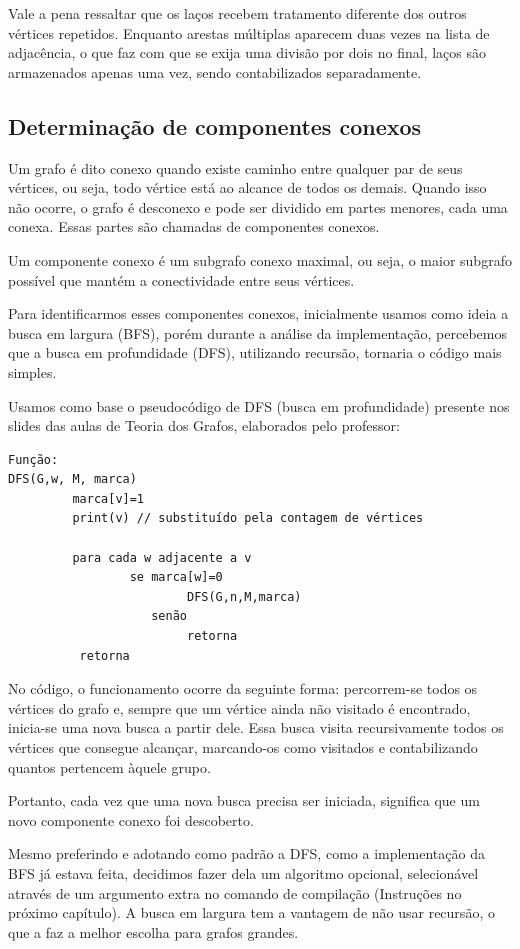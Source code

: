 \documentclass[a4paper, 12pt]{article}
\begin{document}
Vale a pena ressaltar que os laços recebem tratamento diferente dos outros vértices
repetidos. Enquanto arestas múltiplas aparecem duas vezes na lista de adjacência,
o que faz com que se exija uma divisão por dois no final, laços são armazenados
apenas uma vez, sendo contabilizados separadamente.


\subsection{Determinação de componentes conexos}

Um grafo é dito conexo quando existe caminho entre qualquer par de seus vértices,
ou seja, todo vértice está ao alcance de todos os demais. Quando isso não ocorre,
o grafo é desconexo e pode ser dividido em partes menores, cada uma conexa. Essas
partes são chamadas de componentes conexos.

Um componente conexo é um subgrafo conexo maximal, ou seja, o maior subgrafo
possível que mantém a conectividade entre seus vértices. 

Para identificarmos esses componentes conexos, inicialmente usamos como ideia a
busca em largura (BFS), porém durante a análise da implementação, percebemos que
a busca em profundidade (DFS), utilizando recursão, tornaria o código mais simples.

Usamos como base o pseudocódigo de DFS (busca em profundidade) presente nos slides
das aulas de Teoria dos Grafos, elaborados pelo professor:
\begin{verbatim}
Função:
DFS(G,w, M, marca) 
         marca[v]=1 
         print(v) // substituído pela contagem de vértices

         para cada w adjacente a v 
 	             se marca[w]=0 
                         DFS(G,n,M,marca) 
                    senão 
                         retorna
          retorna
\end{verbatim}

No código, o funcionamento ocorre da seguinte forma: percorrem-se todos os vértices
do grafo e, sempre que um vértice ainda não visitado é encontrado, inicia-se uma
nova busca a partir dele. Essa busca visita recursivamente todos os vértices que
consegue alcançar, marcando-os como visitados e contabilizando quantos pertencem
àquele grupo. 

Portanto, cada vez que uma nova busca precisa ser iniciada, significa que um novo
componente conexo foi descoberto.

Mesmo preferindo e adotando como padrão a DFS, como a implementação da BFS já
estava feita, decidimos fazer dela um algoritmo opcional, selecionável através
de um argumento extra no comando de compilação (Instruções no próximo capítulo).
A busca em largura tem a vantagem de não usar recursão, o que a faz a melhor escolha
para grafos grandes.
\newpage
\end{document}
